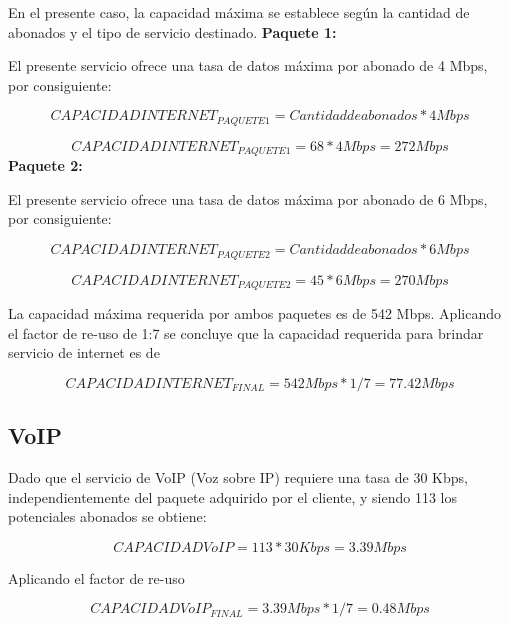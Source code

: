 \documentclass[12pt,a4paper]{book}
\begin{document}
En el presente caso, la capacidad máxima se establece según la cantidad de abonados y el tipo de servicio destinado.
\medskip
\noindent\textbf{Paquete 1:}

El presente servicio ofrece una tasa de datos máxima por abonado de 4 Mbps, por consiguiente:

\begin{equation}
CAPACIDAD INTERNET _{PAQUETE 1} = Cantidad de abonados * 4 Mbps
\end{equation}

\begin{equation}
CAPACIDAD INTERNET _{PAQUETE 1} = 68 * 4 Mbps = 272 Mbps
\end{equation}
\medskip
\noindent\textbf{Paquete 2:}

El presente servicio ofrece una tasa de datos máxima por abonado de 6 Mbps, por consiguiente:

\begin{equation}
CAPACIDAD INTERNET _{PAQUETE 2} = Cantidad de abonados * 6 Mbps
\end{equation}

\begin{equation}
CAPACIDAD INTERNET _{PAQUETE 2} = 45 * 6 Mbps = 270 Mbps
\end{equation}

La capacidad máxima requerida por ambos paquetes es de 542 Mbps. Aplicando el factor de re-uso de 1:7 se concluye que la capacidad requerida para brindar servicio de internet es de 

\begin{equation}
CAPACIDAD INTERNET _{FINAL} = 542 Mbps * 1/7 = 77.42 Mbps
\end{equation}

\subsection{VoIP}

Dado que el servicio de VoIP (Voz sobre IP) requiere una tasa de 30 Kbps, independientemente del paquete adquirido por el cliente, y siendo 113 los potenciales abonados se obtiene:

\begin{equation}
CAPACIDAD VoIP = 113 * 30 Kbps = 3.39 Mbps
\end{equation}

Aplicando el factor de re-uso

\begin{equation}
CAPACIDAD VoIP _{FINAL} = 3.39 Mbps * 1/7 = 0.48 Mbps
\end{equation}
\end{document}
